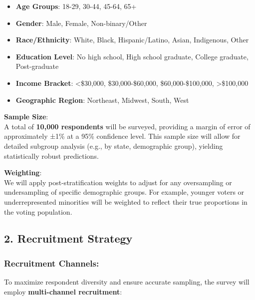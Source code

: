\documentclass[
  letterpaper,
  DIV=11,
  numbers=noendperiod]{scrartcl}
\providecommand{\tightlist}{%
  \setlength{\itemsep}{0pt}\setlength{\parskip}{0pt}}\usepackage{longtable,booktabs,array}
\begin{document}
\begin{itemize}
\tightlist
\item
  \textbf{Age Groups}: 18-29, 30-44, 45-64, 65+\\
\item
  \textbf{Gender}: Male, Female, Non-binary/Other\\
\item
  \textbf{Race/Ethnicity}: White, Black, Hispanic/Latino, Asian,
  Indigenous, Other\\
\item
  \textbf{Education Level}: No high school, High school graduate,
  College graduate, Post-graduate\\
\item
  \textbf{Income Bracket}: \textless\$30,000, \$30,000-\$60,000,
  \$60,000-\$100,000, \textgreater\$100,000\\
\item
  \textbf{Geographic Region}: Northeast, Midwest, South, West
\end{itemize}

\textbf{Sample Size}:\\
A total of \textbf{10,000 respondents} will be surveyed, providing a
margin of error of approximately ±1\% at a 95\% confidence level. This
sample size will allow for detailed subgroup analysis (e.g., by state,
demographic group), yielding statistically robust predictions.

\textbf{Weighting}:\\
We will apply post-stratification weights to adjust for any oversampling
or undersampling of specific demographic groups. For example, younger
voters or underrepresented minorities will be weighted to reflect their
true proportions in the voting population.

\subsection{\texorpdfstring{\textbf{2. Recruitment
Strategy}}{2. Recruitment Strategy}}\label{recruitment-strategy}

\subsubsection{\texorpdfstring{\textbf{Recruitment
Channels}:}{Recruitment Channels:}}\label{recruitment-channels}

To maximize respondent diversity and ensure accurate sampling, the
survey will employ \textbf{multi-channel recruitment}:
\end{document}
